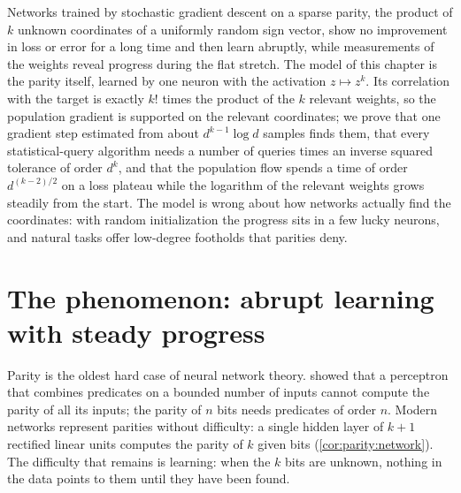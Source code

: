 \newcommand{\parityMaj}{\operatorname{Maj}}

\begin{refsection}

\begin{chaptersummary}
Networks trained by stochastic gradient descent on a sparse parity, the product of $k$ unknown coordinates of a uniformly random sign vector, show no improvement in loss or error for a long time and then learn abruptly, while measurements of the weights reveal progress during the flat stretch. The model of this chapter is the parity itself, learned by one neuron with the activation $z\mapsto z^k$. Its correlation with the target is exactly $k!$ times the product of the $k$ relevant weights, so the population gradient is supported on the relevant coordinates; we prove that one gradient step estimated from about $d^{k-1}\log d$ samples finds them, that every statistical-query algorithm needs a number of queries times an inverse squared tolerance of order $d^k$, and that the population flow spends a time of order $d^{(k-2)/2}$ on a loss plateau while the logarithm of the relevant weights grows steadily from the start. The model is wrong about how networks actually find the coordinates: with random initialization the progress sits in a few lucky neurons, and natural tasks offer low-degree footholds that parities deny.
\end{chaptersummary}

\section{The phenomenon: abrupt learning with steady progress}\label{sec:parity:phenomenon}

Parity is the oldest hard case of neural network theory. \Textcite{MinskyPapert1969} showed that a perceptron that combines predicates on a bounded number of inputs cannot compute the parity of all its inputs; the parity of $n$ bits needs predicates of order $n$. Modern networks represent parities without difficulty: a single hidden layer of $k+1$ rectified linear units computes the parity of $k$ given bits (\cref{cor:parity:network}). The difficulty that remains is learning: when the $k$ bits are unknown, nothing in the data points to them until they have been found.


\end{refsection}

